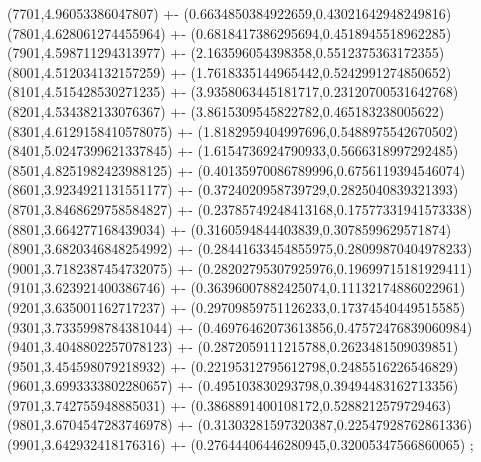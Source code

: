 {(7701,4.96053386047807) +- (0.6634850384922659,0.43021642948249816)
(7801,4.628061274455964) +- (0.6818417386295694,0.4518945518962285)
(7901,4.598711294313977) +- (2.163596054398358,0.5512375363172355)
(8001,4.512034132157259) +- (1.7618335144965442,0.5242991274850652)
(8101,4.515428530271235) +- (3.9358063445181717,0.23120700531642768)
(8201,4.534382133076367) +- (3.8615309545822782,0.465183238005622)
(8301,4.6129158410578075) +- (1.8182959404997696,0.5488975542670502)
(8401,5.0247399621337845) +- (1.6154736924790933,0.5666318997292485)
(8501,4.8251982423988125) +- (0.40135970086789996,0.6756119394546074)
(8601,3.9234921131551177) +- (0.3724020958739729,0.2825040839321393)
(8701,3.8468629758584827) +- (0.23785749248413168,0.17577331941573338)
(8801,3.664277168439034) +- (0.3160594844403839,0.3078599629571874)
(8901,3.6820346848254992) +- (0.28441633454855975,0.28099870404978233)
(9001,3.7182387454732075) +- (0.28202795307925976,0.19699715181929411)
(9101,3.623921400386746) +- (0.36396007882425074,0.11132174886022961)
(9201,3.635001162717237) +- (0.29709859751126233,0.17374540449515585)
(9301,3.7335998784381044) +- (0.46976462073613856,0.47572476839060984)
(9401,3.4048802257078123) +- (0.2872059111215788,0.2623481509039851)
(9501,3.454598079218932) +- (0.22195312795612798,0.2485516226546829)
(9601,3.6993333802280657) +- (0.495103830293798,0.39494483162713356)
(9701,3.742755948885031) +- (0.3868891400108172,0.5288212579729463)
(9801,3.6704547283746978) +- (0.31303281597320387,0.22547928762861336)
(9901,3.642932418176316) +- (0.27644406446280945,0.32005347566860065)
};
